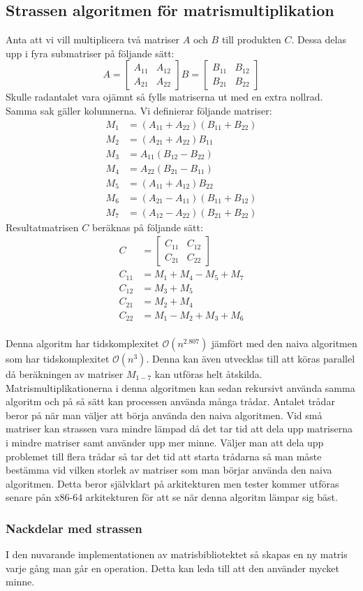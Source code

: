 \subsection{Strassen algoritmen för matrismultiplikation}
\label{sec:strassen}
Anta att vi vill multiplicera två matriser $A$ och $B$ till produkten $C$. Dessa delas upp i fyra submatriser på följande sätt:
 $$A=\begin{bmatrix}
A_{11} & A_{12} \\
A_{21}& A_{22}
 \end{bmatrix}
 B=\begin{bmatrix}
B_{11} & B_{12} \\
B_{21}& B_{22}
 \end{bmatrix}
 $$
 Skulle radantalet vara ojämnt så fylls matriserna ut med en extra nollrad. Samma sak gäller kolumnerna.
 Vi definierar följande matriser:
  \begin{align}
  M_1 & =(A_{11}+A_{22})(B_{11}+B_{22}) \\
  M_2 & =(A_{21}+A_{22})B_{11} \\
  M_3 & =A_{11}(B_{12}-B_{22}) \\
  M_4 & =A_{22}(B_{21}-B_{11}) \\
  M_5 & =(A_{11}+A_{12})B_{22} \\
  M_6 & =(A_{21}-A_{11})(B_{11}+B_{12}) \\
  M_7 & =(A_{12}-A_{22})(B_{21}+B_{22}) 
 \end{align}
 Resultatmatrisen $C$ beräknas på följande sätt:
   \begin{align}
    C & =\begin{bmatrix}
C_{11} & C_{12} \\
C_{21}& C_{22}
 \end{bmatrix} \\
  C_{11} & =M_1+M_4-M_5+M_7 \\
  C_{12} & = M_3+M_5 \\
  C_{21} & = M_2+M_4 \\
  C_{22} & = M_1-M_2+M_3+M_6
 \end{align}
 \\
Denna algoritm har tidskomplexitet $\mathcal{O}(n^{2.807})$ jämfört med den naiva algoritmen som har tidskomplexitet $\mathcal{O}(n^{3})$. Denna kan även utvecklas till att köras parallel då beräkningen av matriser $M_{1-7}$ kan utföras helt åtskilda. Matrismultiplikationerna i denna algoritmen kan sedan rekursivt använda samma algoritm och på så sätt kan processen använda många trådar. Antalet trådar beror på när man väljer att börja använda den naiva algoritmen. Vid små matriser kan strassen vara mindre lämpad då det tar tid att dela upp matriserna i mindre matriser samt använder upp mer minne. Väljer man att dela upp problemet till flera trådar så tar det tid att starta trådarna så man måste bestämma vid vilken storlek av matriser som man börjar använda den naiva algoritmen. Detta beror självklart på arkitekturen men tester kommer utföras senare pån x86-64 arkitekturen för att se när denna algoritm lämpar sig bäst. 
 \subsubsection{Nackdelar med strassen}
 I den nuvarande implementationen av matrisbibliotektet så skapas en ny matris varje gång man går en operation. Detta kan leda till att den använder mycket minne.
 

 
 